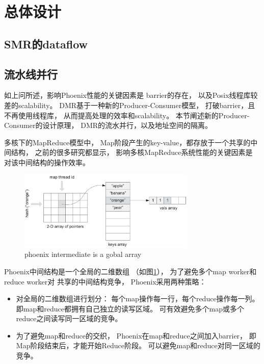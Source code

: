 \section{总体设计}
\subsection{SMR的dataflow}
\subsection{流水线并行}
如上问所述，影响Phoenix性能的关键因素是
barrier的存在，
以及Posix线程库较差的scalability。
DMR基于一种新的Producer-Consumer模型，
打破barrier，且不再使用线程库，
从而提高处理的效率和scalability。
本节阐述新的Producer-Consumer的设计原理，
DMR的流水并行，以及地址空间的隔离。

多核下的MapReduce模型中，
Map阶段产生的key-value，都存放于一个共享的中间结构，
之前的很多研究都显示，
影响多核MapReduce系统性能的关键因素是
对该中间结构的操作效率\cite{mao2010metis}。
\begin{figure}[!h!t]  
    \centering
    \includegraphics[width=0.75\textwidth]{img/phoenix_intermediate.eps}
    \caption{phoenix intermediate is a gobal array}
    \label{phoenix:intermediate}
\end{figure}

Phoenix中间结构是一个全局的二维数组
（如图\ref{phoenix:intermediate}），
为了避免多个map worker和reduce worker对
共享的中间结构竞争，
Phoenix采用两种策略：
\begin{itemize}
  \item 对全局的二维数组进行划分：
  每个map操作每一行，每个reduce操作每一列。
  即map和reduce都拥有自己独立的读写区域。
  可有效避免多个map或多个reduce之间读写同一区域的竞争。
  
  \item 为了避免map和reduce的交织，
  Phoenix在map和reduce之间加入barrier，
  即Map阶段结束后，才能开始Reduce阶段。
  可以避免map和reduce对同一区域的竞争。
\end{itemize}

